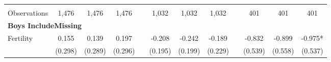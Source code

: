\begin{landscape}
\begin{table}[htpb!]
\begin{center}
\begin{tabular}{lcccp{2mm}cccp{2mm}ccc}
\begin{footnotesize}\end{footnotesize}&\begin{footnotesize}\end{footnotesize}&\begin{footnotesize}\end{footnotesize}&\begin{footnotesize}\end{footnotesize}&\begin{footnotesize}\end{footnotesize}&\begin{footnotesize}\end{footnotesize}&\begin{footnotesize}\end{footnotesize}&\begin{footnotesize}\end{footnotesize}&\begin{footnotesize}\end{footnotesize}&\begin{footnotesize}\end{footnotesize}&\begin{footnotesize}\end{footnotesize}&\begin{footnotesize}\end{footnotesize}\\Observations&1,476&1,476&1,476&&1,032&1,032&1,032&&401&401&401\\
\multicolumn{12}{l}{\textbf{Boys IncludeMissing}}\\ 
Fertility&0.155&0.139&0.197&&-0.208&-0.242&-0.189&&-0.832&-0.899&-0.975*\\
&(0.298)&(0.289)&(0.296)&&(0.195)&(0.199)&(0.229)&&(0.539)&(0.558)&(0.537)\\

\end{tabular}
\end{center}
\end{table}
\end{landscape}
